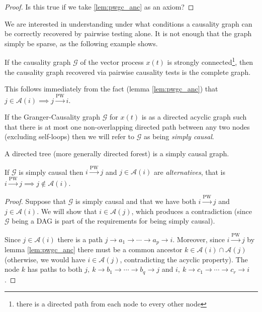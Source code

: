 \documentclass[12pt]{article}
\def\pwgc{\overset{\text{PW}}{\rightarrow}}  %
\def\gcg{\mathcal{G}}  %
\newcommand{\anc}[1]{\mathcal{A}(#1)}  %
\newcommand{\gcgpath}[4]{#1 \rightarrow #2_1 \rightarrow \cdots \rightarrow #2_{#3} \rightarrow #4}
\begin{document}
\begin{proof}
  Is this true if we take \ref{lem:pwgc_anc} as an axiom?
\end{proof}


We are interested in understanding under what conditions a causality
graph can be correctly recovered by pairwise testing alone.  It is not
enough that the graph simply be sparse, as the following example shows.

\begin{example}
  If the causality graph $\gcg$ of the vector process $x(t)$ is
  strongly connected\footnote{there is a directed path from each node
    to every other node}, then the causality graph recovered via
  pairwise causality tests is the complete graph.

  This follows immediately from the fact (lemma \ref{lem:pwgc_anc})
  that $j \in \anc{i} \implies j \pwgc i$.
\end{example}

\begin{definition}
  If the Granger-Causality graph $\gcg$ for $x(t)$ is as a directed
  acyclic graph such that there is at most one non-overlapping
  directed path between any two nodes (excluding self-loops) then we
  will refer to $\gcg$ as being \textit{simply causal}.
\end{definition}

\begin{example}
  A directed tree (more generally directed forest) is a simply causal
  graph.
\end{example}

\begin{lemma}
  If $\gcg$ is simply causal then $i \pwgc j$ and $j \in \anc{i}$ are
  \textit{alternatives}, that is $i \pwgc j \implies j \notin \anc{i}$.
\end{lemma}
\begin{proof}
  Suppose that $\gcg$ is simply causal and that we have both
  $i \pwgc j$ and $j \in \anc{i}$.  We will show that $i \in \anc{j}$,
  which produces a contradiction (since $\gcg$ being a DAG is part of
  the requirements for being simply causal).

  Since $j \in \anc{i}$ there is a path $\gcgpath{j}{a}{p}{i}$.
  Moreover, since $i \pwgc j$ by lemma \ref{lem:pwgc_anc} there must
  be a common ancestor $k \in \anc{i} \cap \anc{j}$ (otherwise, we would
  have $i \in \anc{j}$, contradicting the acyclic property).  The node
  $k$ has paths to both $j,\ \gcgpath{k}{b}{q}{j}$ and $i,\ \gcgpath{k}{c}{r}{i}$.

\end{proof}
\end{document}
